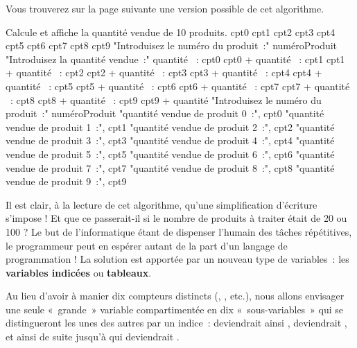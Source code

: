 		Vous trouverez sur la page suivante
		une version possible de cet algorithme.
	
		\begin{LDA}
		\LComment Calcule et affiche la quantité vendue de 10 produits.
			\Empty
			\Empty
			\Let cpt0 
			\Let cpt1 
			\Let cpt2 
			\Let cpt3 
			\Let cpt4 
			\Let cpt5 
			\Let cpt6 
			\Let cpt7 
			\Let cpt8 
			\Let cpt9 
			\Empty
			\Write "Introduisez le numéro du produit~:"
			\Read numéroProduit
			\Empty
			\Empty
				\Write "Introduisez la quantité vendue~:"
				\Read quantité
				\Empty
					~: cpt0 \Gets cpt0 + quantité
					~: cpt1 \Gets cpt1 + quantité
					~: cpt2 \Gets cpt2 + quantité
					~: cpt3 \Gets cpt3 + quantité
					~: cpt4 \Gets cpt4 + quantité
					~: cpt5 \Gets cpt5 + quantité
					~: cpt6 \Gets cpt6 + quantité
					~: cpt7 \Gets cpt7 + quantité
					~: cpt8 \Gets cpt8 + quantité
					~: cpt9 \Gets cpt9 + quantité
				\EndSwitch
				\Empty
				\Write "Introduisez le numéro du produit~:"
				\Read numéroProduit
				\Empty
			\EndWhile
			\Empty
			\Write "quantité vendue de produit 0~:", cpt0
			\Write "quantité vendue de produit 1~:", cpt1
			\Write "quantité vendue de produit 2~:", cpt2
			\Write "quantité vendue de produit 3~:", cpt3
			\Write "quantité vendue de produit 4~:", cpt4
			\Write "quantité vendue de produit 5~:", cpt5
			\Write "quantité vendue de produit 6~:", cpt6
			\Write "quantité vendue de produit 7~:", cpt7
			\Write "quantité vendue de produit 8~:", cpt8
			\Write "quantité vendue de produit 9~:", cpt9
			\Empty
		\EndAlgo
		\end{LDA}
	
		Il est clair, à la lecture de cet algorithme, 
		qu’une simplification d’écriture s’impose ! 
		Et que ce passerait-il si le nombre de produits à
		traiter était de 20 ou 100 ? 
		Le but de l’informatique étant de dispenser l’humain 
		des tâches répétitives, 
		le programmeur peut en espérer autant 
		de la part d’un langage de programmation !
		La solution est apportée par un nouveau type de variables~: 
		les \textbf{variables indicées} ou \textbf{tableaux}.
	
		Au lieu d’avoir à manier dix compteurs distincts
		(, , etc.), 
		nous allons envisager une seule «~grande~» variable 
		 compartimentée en dix «~sous-variables~» 
		qui se distingueront les unes des autres par un indice~: 
		 deviendrait ainsi , 
		 deviendrait , 
		et ainsi de suite jusqu’à
		 qui deviendrait .
	
